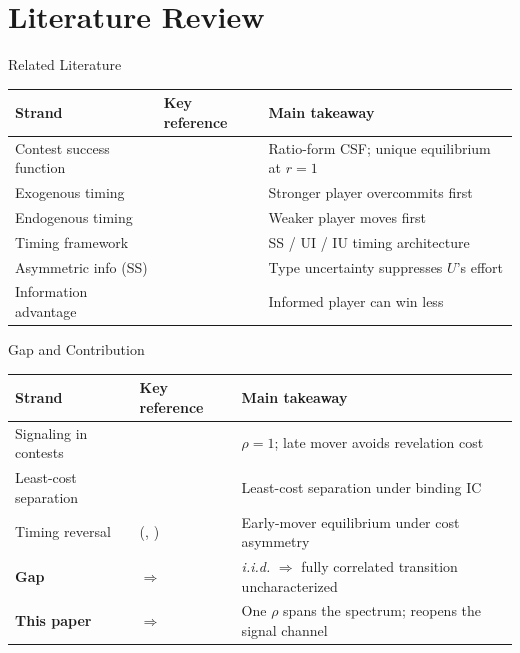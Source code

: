 \documentclass[aspectratio=169, 12pt]{beamer}
\begin{document}
\section{Literature Review}

\begin{frame}{Related Literature}
  \footnotesize
  \begin{center}
    \renewcommand{\arraystretch}{1.15}
    \begin{tabular}{@{}llp{5.2cm}@{}}
      \toprule
      Strand & Key reference & Main takeaway \\
      \midrule
      Contest success function & \citet{tullock1980}
        & Ratio-form CSF; unique equilibrium at $r = 1$ \\
      Exogenous timing & \citet{dixit1987}
        & Stronger player overcommits first\\
      Endogenous timing & \citet{baikshogren1992}
        & Weaker player moves first \\
      Timing framework & \citet{hamilton1990}
        & SS / UI / IU timing architecture \\
      Asymmetric info (SS) & \citet{hurley1998}
        & Type uncertainty suppresses $U$'s effort \\
      Information advantage & \citet{warneryd2003}
        & Informed player can win less \\
      \bottomrule
    \end{tabular}
  \end{center}
\end{frame}

\begin{frame}{Gap and Contribution}
  \footnotesize
  \begin{center}
    \renewcommand{\arraystretch}{1.15}
    \begin{tabular}{@{}llp{5.2cm}@{}}
      \toprule
      Strand & Key reference & Main takeaway \\
      \midrule
      Signaling in contests & \citet{fu2006}
        & $\rho = 1$; late mover avoids revelation cost \\
      Least-cost separation & \citet{riley1979}
        & Least-cost separation under binding IC \\
      Timing reversal
        & \citeauthor{protopappas2023} (\citeyear{protopappas2023}, \citeyear{protopappas2025})
        & Early-mover equilibrium under cost asymmetry \\
      \textbf{Gap} & $\Rightarrow$
        & \textit{i.i.d.} $\Rightarrow$ fully correlated transition uncharacterized \\
      \textbf{This paper} & $\Rightarrow$
        & One $\rho$ spans the spectrum; reopens the signal channel \\
      \bottomrule
    \end{tabular}
  \end{center}
\end{frame}
\end{document}
